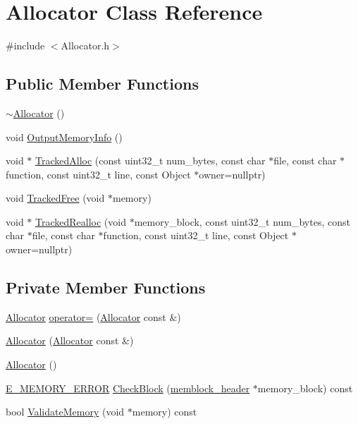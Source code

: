 \section{Allocator Class Reference}
\label{class_allocator}


{\ttfamily \#include $<$Allocator.\-h$>$}

\subsection*{Public Member Functions}
\begin{DoxyCompactItemize}
\item 
\hyperlink{class_allocator_ae6af139c96381e0c00dc82d291669577}{$\sim$\-Allocator} ()
\item 
void \hyperlink{class_allocator_a2d9d6327796ee89122783396f4014b28}{Output\-Memory\-Info} ()
\item 
void $\ast$ \hyperlink{class_allocator_aff5c82b73f460d9520d440373b86acdb}{Tracked\-Alloc} (const uint32\-\_\-t num\-\_\-bytes, const char $\ast$file, const char $\ast$function, const uint32\-\_\-t line, const Object $\ast$owner=nullptr)
\item 
void \hyperlink{class_allocator_ae88ef2e17cf916e2efdf96280adca9fb}{Tracked\-Free} (void $\ast$memory)
\item 
void $\ast$ \hyperlink{class_allocator_a4b9da5e10ea4e5952437b83ba54742ad}{Tracked\-Realloc} (void $\ast$memory\-\_\-block, const uint32\-\_\-t num\-\_\-bytes, const char $\ast$file, const char $\ast$function, const uint32\-\_\-t line, const Object $\ast$owner=nullptr)
\end{DoxyCompactItemize}
\subsection*{Private Member Functions}
\begin{DoxyCompactItemize}
\item 
\hyperlink{class_allocator}{Allocator} \hyperlink{class_allocator_a613e931c75f43c3016577cafcdccb1ed}{operator=} (\hyperlink{class_allocator}{Allocator} const \&)
\item 
\hyperlink{class_allocator_ad5d479295ad0b494ac3bbc5defe00695}{Allocator} (\hyperlink{class_allocator}{Allocator} const \&)
\item 
\hyperlink{class_allocator_acd81cd6a9337a081c558f89661b623d7}{Allocator} ()
\item 
\hyperlink{_allocator_8h_adc7040deea27628dba424c534b71dbbf}{E\-\_\-\-M\-E\-M\-O\-R\-Y\-\_\-\-E\-R\-R\-O\-R} \hyperlink{class_allocator_ad1c15835d7b080beb8c56b21e0014553}{Check\-Block} (\hyperlink{structmemblock__header}{memblock\-\_\-header} $\ast$memory\-\_\-block) const 
\item 
bool \hyperlink{class_allocator_abff2b252396640dde0593c12ee7f62b4}{Validate\-Memory} (void $\ast$memory) const 
\end{DoxyCompactItemize}
